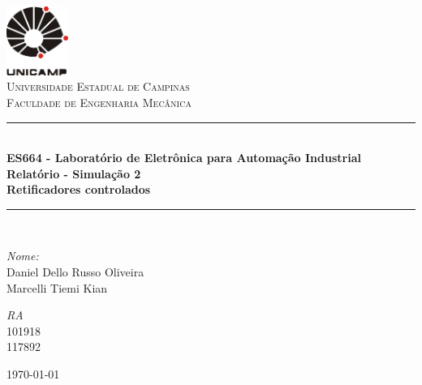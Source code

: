 
\begin{titlepage}
\begin{center}

\newcommand{\HRule}{\rule{\linewidth}{0.5mm}}
\includegraphics[width=0.15\textwidth]{logoUnicamp}~\\[1cm]

\textsc{\LARGE Universidade Estadual de Campinas}\\[1.5cm]

\textsc{\Large Faculdade de Engenharia Mecânica}\\[0.5cm]

\HRule \\[0.4cm]
{ \huge \bfseries ES664 - Laboratório de Eletrônica para Automação Industrial\\ \vspace{1cm} Relatório - Simulação 2\\
\Large{Retificadores controlados} \\[0.4cm] }

\HRule \\[1.5cm]

\begin{minipage}{0.6\textwidth}
\begin{flushleft} \large
\emph{Nome:}\\
Daniel Dello Russo Oliveira\\Marcelli Tiemi Kian
\end{flushleft}
\end{minipage}
\begin{minipage}{0.2\textwidth}
\begin{flushright} \large
\emph{RA}\\ 101918\\117892
\end{flushright}
\end{minipage}

\vfill

{\large \today}

\end{center}
\end{titlepage}
